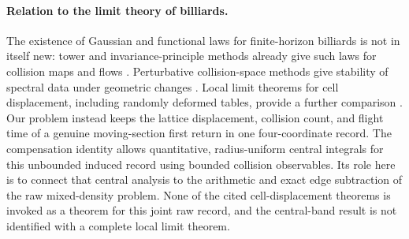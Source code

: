 \documentclass[11pt,reqno]{amsart}
\numberwithin{equation}{section}
\theoremstyle{definition}\newtheorem{definition}[theorem]{Definition}
\theoremstyle{remark}\newtheorem{remark}[theorem]{Remark}
\begin{document}
\paragraph{Relation to the limit theory of billiards.}
The existence of Gaussian and functional laws for finite-horizon
billiards is not in itself new: tower and invariance-principle methods
already give such laws for collision maps and flows
\cite{Young,MN}. Perturbative collision-space methods give stability of
spectral data under geometric changes \cite{DZ}. Local limit theorems
for cell displacement, including randomly deformed tables, provide a
further comparison \cite{SV,DPZ}. Our problem instead keeps the lattice
displacement, collision count, and flight time of a genuine moving-section
first return in one four-coordinate record. The compensation identity
allows quantitative, radius-uniform central integrals for this
unbounded induced record using bounded collision observables. Its role
here is to connect that central analysis to the arithmetic and exact
edge subtraction of the raw mixed-density problem. None of the cited
cell-displacement theorems is invoked as a theorem for this joint raw
record, and the central-band result is not identified with a complete
local limit theorem.


















\end{document}
